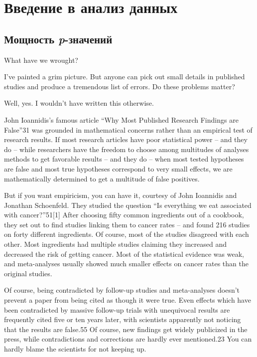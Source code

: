 \chapter{Введение в анализ данных}
\label{chp11}

\section{Мощность \emph{p}-значений}
\label{chp11: }

What have we wrought?

I’ve painted a grim picture. But anyone can pick out small details in published studies and produce a tremendous list of errors. Do these problems matter?

Well, yes. I wouldn’t have written this otherwise.

John Ioannidis’s famous article “Why Most Published Research Findings are False”31 was grounded in mathematical concerns rather than an empirical test of research results. If most research articles have poor statistical power – and they do – while researchers have the freedom to choose among multitudes of analyses methods to get favorable results – and they do – when most tested hypotheses are false and most true hypotheses correspond to very small effects, we are mathematically determined to get a multitude of false positives.

But if you want empiricism, you can have it, courtesy of John Ioannidis and Jonathan Schoenfeld. They studied the question “Is everything we eat associated with cancer?”51[1] After choosing fifty common ingredients out of a cookbook, they set out to find studies linking them to cancer rates – and found 216 studies on forty different ingredients. Of course, most of the studies disagreed with each other. Most ingredients had multiple studies claiming they increased and decreased the risk of getting cancer. Most of the statistical evidence was weak, and meta-analyses usually showed much smaller effects on cancer rates than the original studies.

Of course, being contradicted by follow-up studies and meta-analyses doesn’t prevent a paper from being cited as though it were true. Even effects which have been contradicted by massive follow-up trials with unequivocal results are frequently cited five or ten years later, with scientists apparently not noticing that the results are false.55 Of course, new findings get widely publicized in the press, while contradictions and corrections are hardly ever mentioned.23 You can hardly blame the scientists for not keeping up.


